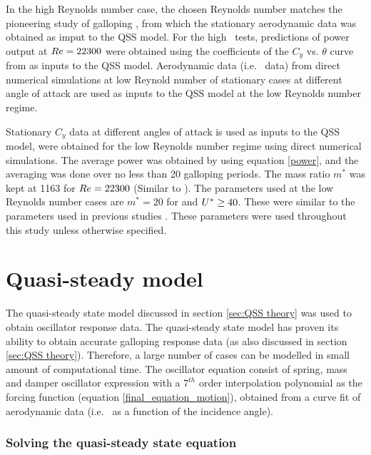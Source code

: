 In the high Reynolds number case, the chosen Reynolds number matches the pioneering study of galloping \citet{Parkinson1964}, from which the stationary aerodynamic data was obtained as imput to the QSS model. For the high \reynoldsnumber\ tests, predictions of power output at $Re=22300$ were obtained using the coefficients of the $C_y$  vs. $\theta$ curve from \citet{Parkinson1964} as inputs to the QSS model. Aerodynamic data (i.e. \cy\ data) from direct numerical simulations at low Reynold number of stationary cases at different angle of attack are used as inputs to the QSS model at the low Reynolds number regime. 

Stationary $C_y$ data at different angles of attack is used as inputs to the QSS model, were obtained  for the low Reynolds number regime using direct numerical simulations. The average power was obtained by using equation \ref{power}, and the averaging was done over no less than 20 galloping periods. The mass ratio $m^*$ was kept at 1163 for $Re=22300$ (Similar to \citet{Parkinson1964}). The parameters used at the low Reynolds number cases are $m^*=20$ for  and $U^{*}\geq 40$. These were similar to the parameters used in previous studies \citep{Robertson2003,Joly2012}. These parameters were used throughout this study unless otherwise specified.

\section{Quasi-steady model}
\label{sec:QSS_model_methodology}

The quasi-steady state model discussed in section \ref{sec:QSS theory} was used to obtain oscillator response data. The quasi-steady state model has proven its ability to obtain accurate galloping response data (as also discussed in section \ref{sec:QSS theory}). Therefore, a large number of cases can be modelled in small amount of computational time. The oscillator equation consist of spring, mass and damper oscillator expression with a $7^{th}$ order interpolation polynomial as the forcing function (equation \ref{final_equation_motion}), obtained from a curve fit of aerodynamic data (i.e. \cy\ as a function of the incidence angle).

\subsubsection{Solving the quasi-steady state equation}

